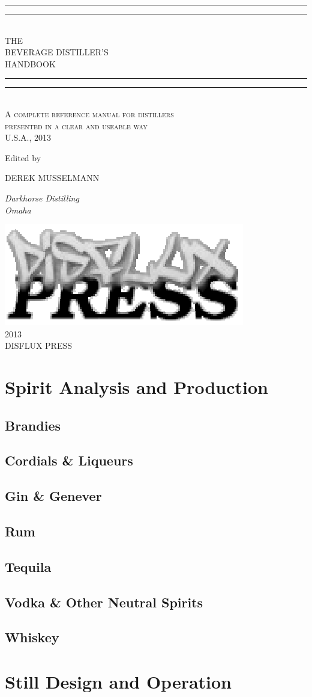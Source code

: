 \documentclass[10pt,ebook,extrafontsizes]{memoir}
\newcommand*{\titleGP}{\begingroup %
\centering %
\vspace*{\baselineskip} %

\rule{\textwidth}{1.6pt}\vspace*{-\baselineskip}\vspace*{2pt} %
\rule{\textwidth}{0.4pt}\\[\baselineskip] %

{\LARGE THE \\ BEVERAGE DISTILLER'S \\[0.3\baselineskip] HANDBOOK}\\[0.2\baselineskip] %

\rule{\textwidth}{0.4pt}\vspace*{-\baselineskip}\vspace{3.2pt} %
\rule{\textwidth}{1.6pt}\\[\baselineskip] %

\scshape %
A complete reference manual for distillers\\ %
presented  in a clear and useable way \\[\baselineskip] %
U.S.A.,  2013\par %

\vspace*{2\baselineskip} %

Edited by \\[\baselineskip]
{\Large DEREK MUSSELMANN\par} %
{\itshape Darkhorse Distilling \\ Omaha\par} %

\vfill %
\includegraphics[scale=0.55]{disfluxpress.eps} \\[0.3\baselineskip]
{\scshape 2013} \\[0.3\baselineskip] %
{\large DISFLUX PRESS}\par %

\endgroup}
\begin{document}
\pagestyle{empty}
\titleGP
\clearpage
\tableofcontents
\pagestyle{plain}

\part{Spirit Analysis and Production}

\chapter{Brandies}

\chapter{Cordials \& Liqueurs}

\chapter{Gin \& Genever}



\chapter{Rum}

\chapter{Tequila}

\chapter{Vodka \& Other Neutral Spirits}

\chapter{Whiskey}

\part{Still Design and Operation}

\clearpage
\printbibliography
\printindex
\end{document}
